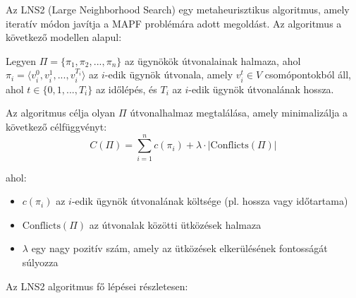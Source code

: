 \documentclass[a4paper,12pt]{article}
\begin{document}
Az LNS2 (Large Neighborhood Search) egy metaheurisztikus algoritmus, amely iteratív módon javítja a MAPF problémára adott megoldást. Az algoritmus a következő modellen alapul:

Legyen $\Pi = \{\pi_1, \pi_2, ..., \pi_n\}$ az ügynökök útvonalainak halmaza, ahol $\pi_i = \langle v_i^0, v_i^1, ..., v_i^{T_i} \rangle$ az $i$-edik ügynök útvonala, amely $v_i^t \in V$ csomópontokból áll, ahol $t \in \{0, 1, ..., T_i\}$ az időlépés, és $T_i$ az $i$-edik ügynök útvonalának hossza.

Az algoritmus célja olyan $\Pi$ útvonalhalmaz megtalálása, amely minimalizálja a következő célfüggvényt:
\[
C(\Pi) = \sum_{i=1}^{n} c(\pi_i) + \lambda \cdot |\text{Conflicts}(\Pi)|
\]

ahol:
\begin{itemize}
    \item $c(\pi_i)$ az $i$-edik ügynök útvonalának költsége (pl. hossza vagy időtartama)
    \item $\text{Conflicts}(\Pi)$ az útvonalak közötti ütközések halmaza
    \item $\lambda$ egy nagy pozitív szám, amely az ütközések elkerülésének fontosságát súlyozza
\end{itemize}

Az LNS2 algoritmus fő lépései részletesen:
\end{document}

